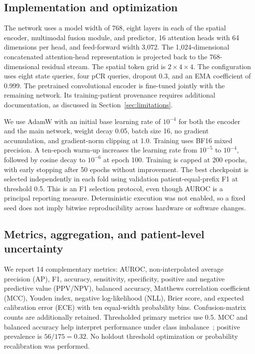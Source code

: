 \subsection{Implementation and optimization}
The network uses a model width of 768, eight layers in each of the spatial encoder, multimodal fusion module, and predictor, 16 attention heads with 64 dimensions per head, and feed-forward width 3,072. The 1,024-dimensional concatenated attention-head representation is projected back to the 768-dimensional residual stream. The spatial token grid is $2\times4\times4$. The configuration uses eight state queries, four pCR queries, dropout 0.3, and an EMA coefficient of 0.999. The pretrained convolutional encoder is fine-tuned jointly with the remaining network. Its training-patient provenance requires additional documentation, as discussed in Section~\ref{sec:limitations}.

We use AdamW \citep{adamw2019} with an initial base learning rate of $10^{-4}$ for both the encoder and the main network, weight decay 0.05, batch size 16, no gradient accumulation, and gradient-norm clipping at 1.0. Training uses BF16 mixed precision. A ten-epoch warm-up increases the learning rate from $10^{-5}$ to $10^{-4}$, followed by cosine decay to $10^{-6}$ at epoch 100. Training is capped at 200 epochs, with early stopping after 50 epochs without improvement. The best checkpoint is selected independently in each fold using validation patient-equal-prefix F1 at threshold 0.5. This is an F1 selection protocol, even though AUROC is a principal reporting measure. Deterministic execution was not enabled, so a fixed seed does not imply bitwise reproducibility across hardware or software changes.

\subsection{Metrics, aggregation, and patient-level uncertainty}
We report 14 complementary metrics: AUROC, non-interpolated average precision (AP), F1, accuracy, sensitivity, specificity, positive and negative predictive value (PPV/NPV), balanced accuracy, Matthews correlation coefficient (MCC), Youden index, negative log-likelihood (NLL), Brier score, and expected calibration error (ECE) with ten equal-width probability bins. Confusion-matrix counts are additionally retained. Thresholded primary metrics use 0.5. MCC and balanced accuracy help interpret performance under class imbalance~\citep{chicco2020mcc}; positive prevalence is $56/175=0.32$. No holdout threshold optimization or probability recalibration was performed.

